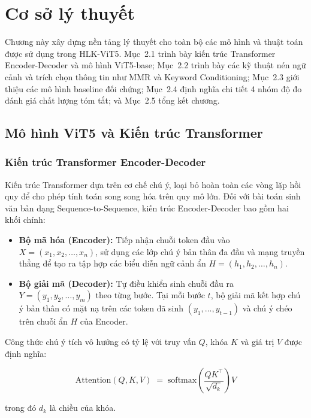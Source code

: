 \chapter{Cơ sở lý thuyết}

Chương này xây dựng nền tảng lý thuyết cho toàn bộ các mô hình và thuật toán được sử dụng trong HLK-ViT5.
Mục~2.1 trình bày kiến trúc Transformer Encoder-Decoder và mô hình ViT5-base;
Mục~2.2 trình bày các kỹ thuật nén ngữ cảnh và trích chọn thông tin như MMR và Keyword Conditioning;
Mục~2.3 giới thiệu các mô hình baseline đối chứng;
Mục~2.4 định nghĩa chi tiết 4 nhóm độ đo đánh giá chất lượng tóm tắt; và Mục~2.5 tổng kết chương.

\section{Mô hình ViT5 và Kiến trúc Transformer}

\subsection{Kiến trúc Transformer Encoder-Decoder}

Kiến trúc Transformer \cite{Vaswani2017} dựa trên cơ chế chú ý, loại bỏ hoàn toàn các vòng lặp hồi quy để cho phép tính toán song song hóa trên quy mô lớn. Đối với bài toán sinh văn bản dạng Sequence-to-Sequence, kiến trúc Encoder-Decoder bao gồm hai khối chính:

\begin{itemize}
  \item \textbf{Bộ mã hóa (Encoder):} Tiếp nhận chuỗi token đầu vào $X = (x_1, x_2, \ldots, x_n)$, sử dụng các lớp chú ý bản thân đa đầu và mạng truyền thẳng để tạo ra tập hợp các biểu diễn ngữ cảnh ẩn $H = (h_1, h_2, \ldots, h_n)$.
  \item \textbf{Bộ giải mã (Decoder):} Tự điều khiển sinh chuỗi đầu ra $Y = (y_1, y_2, \ldots, y_m)$ theo từng bước. Tại mỗi bước $t$, bộ giải mã kết hợp chú ý bản thân có mặt nạ trên các token đã sinh $(y_1, \ldots, y_{t-1})$ và chú ý chéo trên chuỗi ẩn $H$ của Encoder.
\end{itemize}

Công thức chú ý tích vô hướng có tỷ lệ với truy vấn $Q$, khóa $K$ và giá trị $V$ được định nghĩa:

\[
\text{Attention}(Q,K,V) \;=\; \text{softmax}\!\left(\frac{QK^{\top}}{\sqrt{d_k}}\right) V
\]

\noindent trong đó $d_k$ là chiều của khóa.

